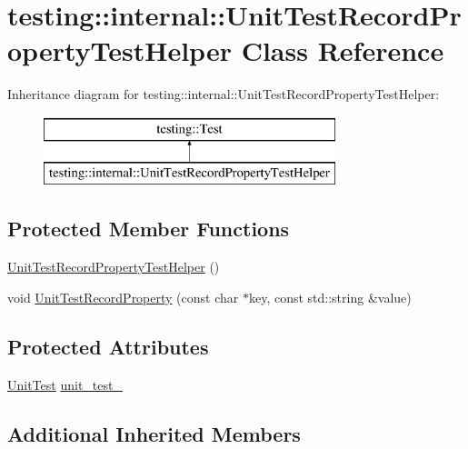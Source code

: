 \hypertarget{classtesting_1_1internal_1_1_unit_test_record_property_test_helper}{}\section{testing\+:\+:internal\+:\+:Unit\+Test\+Record\+Property\+Test\+Helper Class Reference}
\label{classtesting_1_1internal_1_1_unit_test_record_property_test_helper}
Inheritance diagram for testing\+:\+:internal\+:\+:Unit\+Test\+Record\+Property\+Test\+Helper\+:\begin{figure}[H]
\begin{center}
\leavevmode
\includegraphics[height=2.000000cm]{classtesting_1_1internal_1_1_unit_test_record_property_test_helper}
\end{center}
\end{figure}
\subsection*{Protected Member Functions}
\begin{DoxyCompactItemize}
\item 
\hyperlink{classtesting_1_1internal_1_1_unit_test_record_property_test_helper_aa2bdfe52eb2aab5233ce9118917a4750}{Unit\+Test\+Record\+Property\+Test\+Helper} ()
\item 
void \hyperlink{classtesting_1_1internal_1_1_unit_test_record_property_test_helper_a9c5432d080faf13a1db6baff0a2944f4}{Unit\+Test\+Record\+Property} (const char $\ast$key, const std\+::string \&value)
\end{DoxyCompactItemize}
\subsection*{Protected Attributes}
\begin{DoxyCompactItemize}
\item 
\hyperlink{classtesting_1_1_unit_test}{Unit\+Test} \hyperlink{classtesting_1_1internal_1_1_unit_test_record_property_test_helper_a415e13a354d3b8bd97db96aae5ef5df1}{unit\+\_\+test\+\_\+}
\end{DoxyCompactItemize}
\subsection*{Additional Inherited Members}


